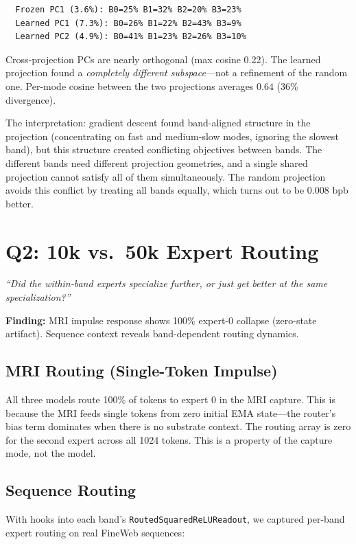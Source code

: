 \documentclass[11pt,a4paper]{report}
\newcommand{\cq}[1]{\textcolor{q}{\textit{``#1''}}}
\newcommand{\finding}[1]{\textcolor{finding}{\textbf{Finding:}} #1}
\begin{document}
\begin{verbatim}
  Frozen PC1 (3.6%): B0=25% B1=32% B2=20% B3=23%
  Learned PC1 (7.3%): B0=26% B1=22% B2=43% B3=9%
  Learned PC2 (4.9%): B0=41% B1=23% B2=26% B3=10%
\end{verbatim}

Cross-projection PCs are nearly orthogonal (max cosine 0.22). The learned projection found a \emph{completely different subspace}---not a refinement of the random one. Per-mode cosine between the two projections averages 0.64 (36\% divergence).

The interpretation: gradient descent found band-aligned structure in the projection (concentrating on fast and medium-slow modes, ignoring the slowest band), but this structure created conflicting objectives between bands. The different bands need different projection geometries, and a single shared projection cannot satisfy all of them simultaneously. The random projection avoids this conflict by treating all bands equally, which turns out to be 0.008 bpb better.


\section{Q2: 10k vs.\ 50k Expert Routing}

\cq{Did the within-band experts specialize further, or just get better at the same specialization?}

\finding{MRI impulse response shows 100\% expert-0 collapse (zero-state artifact). Sequence context reveals band-dependent routing dynamics.}

\subsection{MRI Routing (Single-Token Impulse)}

All three models route 100\% of tokens to expert 0 in the MRI capture. This is because the MRI feeds single tokens from zero initial EMA state---the router's bias term dominates when there is no substrate context. The routing array is zero for the second expert across all 1024 tokens. This is a property of the capture mode, not the model.

\subsection{Sequence Routing}

With hooks into each band's \texttt{RoutedSquaredReLUReadout}, we captured per-band expert routing on real FineWeb sequences:
\end{document}
